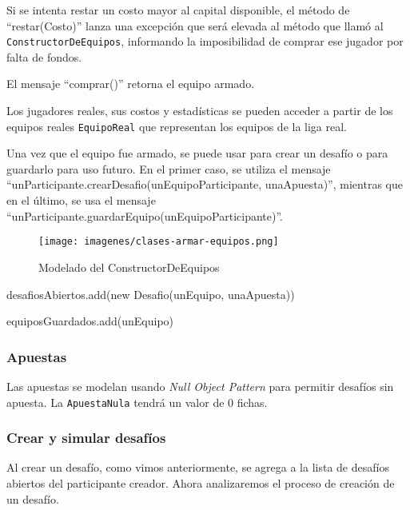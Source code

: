 Si se intenta restar un costo mayor al capital disponible, el método de ``restar(Costo)'' lanza una excepción que será elevada al método que llamó
al {\tt ConstructorDeEquipos}, informando la imposibilidad de comprar ese jugador por falta de fondos.

El mensaje ``comprar()'' retorna el equipo armado.

Los jugadores reales, sus costos y estadísticas se pueden acceder a partir de los equipos reales {\tt EquipoReal} que representan los equipos de la 
liga real.

Una vez que el equipo fue armado, se puede usar para crear un desafío o para guardarlo para uso futuro. En el primer caso, se utiliza el mensaje
``unParticipante.crearDesafio(unEquipoParticipante, unaApuesta)'', mientras que en el último, se usa el
mensaje ``unParticipante.guardarEquipo(unEquipoParticipante)''.

\begin{figure}[h!]
   \texttt{[image: imagenes/clases-armar-equipos.png]}
   \caption{Modelado del ConstructorDeEquipos}
\end{figure}

\begin{algorithmic}
	  \State desafiosAbiertos.add(new Desafio(unEquipo, unaApuesta))
	\EndFunction
\end{algorithmic}

\begin{algorithmic}
	  \State equiposGuardados.add(unEquipo)
	\EndFunction
\end{algorithmic}

\subsubsection{Apuestas}
Las apuestas se modelan usando \emph{Null Object Pattern} para permitir desafíos sin apuesta. La {\tt ApuestaNula} tendrá un valor de 0 fichas.

\subsubsection{Crear y simular desafíos}
Al crear un desafío, como vimos anteriormente, se agrega a la lista de desafíos abiertos del participante creador. Ahora analizaremos el proceso de
creación de un desafío.

